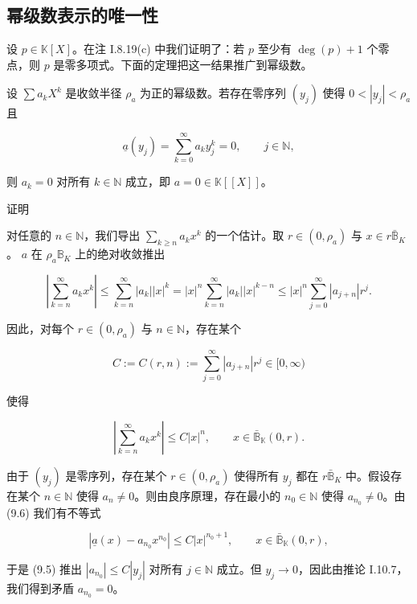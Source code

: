\subsection*{幂级数表示的唯一性}

设 $p \in \mathbb{K}[X]$。在注 I.8.19(c) 中我们证明了：若 $p$ 至少有 $\deg(p) + 1$ 个零点，则 $p$ 是零多项式。下面的定理把这一结果推广到幂级数。

\begin{theorem}

设  $ \sum a_k X^k $ 是收敛半径  $ \rho_a $ 为正的幂级数。若存在零序列  $ (y_j) $ 使得  $ 0 < |y_j| < \rho_a $ 且

\begin{equation}
\underline{a}(y_{j})=\sum_{k=0}^{\infty}a_{k}y_{j}^{k}=0,\qquad j\in\mathbb{N},
\end{equation}

则  $ a_k = 0 $ 对所有  $ k \in \mathbb{N} $ 成立，即  $ a = 0 \in \mathbb{K}[\![X]\!] $。

证明

\begin{subitems}
\item

对任意的  $ n \in \mathbb{N} $，我们导出  $ \sum_{k \geq n} a_k x^k $ 的一个估计。取  $ r \in (0, \rho_a) $ 与  $ x \in r\bar{\mathbb{B}}_K $。 $ a $ 在  $ \rho_a\mathbb{B}_K $ 上的绝对收敛推出

\[
\left|\sum_{k=n}^{\infty}a_{k}x^{k}\right|\leq\sum_{k=n}^{\infty}\left|a_{k}\right|\left|x\right|^{k}=\left|x\right|^{n}\sum_{k=n}^{\infty}\left|a_{k}\right|\left|x\right|^{k-n}\leq\left|x\right|^{n}\sum_{j=0}^{\infty}\left|a_{j+n}\right|r^{j}.
\]

因此，对每个  $ r \in (0, \rho_a) $ 与  $ n \in \mathbb{N} $，存在某个

\[
C:=C(r,n):=\sum_{j=0}^{\infty}|a_{j+n}|r^{j}\in[0,\infty)
\]

使得

\begin{equation}
\left|\sum_{k=n}^{\infty}a_{k}x^{k}\right|\leq C\left|x\right|^{n},\qquad x\in\bar{\mathbb{B}}_{\mathbb{K}}(0,r).
\end{equation}
\item

由于 $(y_j)$ 是零序列，存在某个 $r \in (0, \rho_a)$ 使得所有 $y_j$ 都在 $r\bar{\mathbb{B}}_K$ 中。假设存在某个 $n \in \mathbb{N}$ 使得 $a_n \neq 0$。则由良序原理，存在最小的 $n_0 \in \mathbb{N}$ 使得 $a_{n_0} \neq 0$。由 (9.6) 我们有不等式

\[
|\underline{{a}}(x)-a_{n_{0}}x^{n_{0}}|\leq C\left|x\right|^{n_{0}+1},\qquad x\in\bar{\mathbb{B}}_{\mathbb{K}}(0,r),
\]

于是 (9.5) 推出  $ |a_{n_0}| \leq C|y_j| $ 对所有  $ j \in \mathbb{N} $ 成立。但  $ y_j \to 0 $，因此由推论 I.10.7，我们得到矛盾  $ a_{n_0} = 0 $。

\end{subitems}

\end{theorem}

